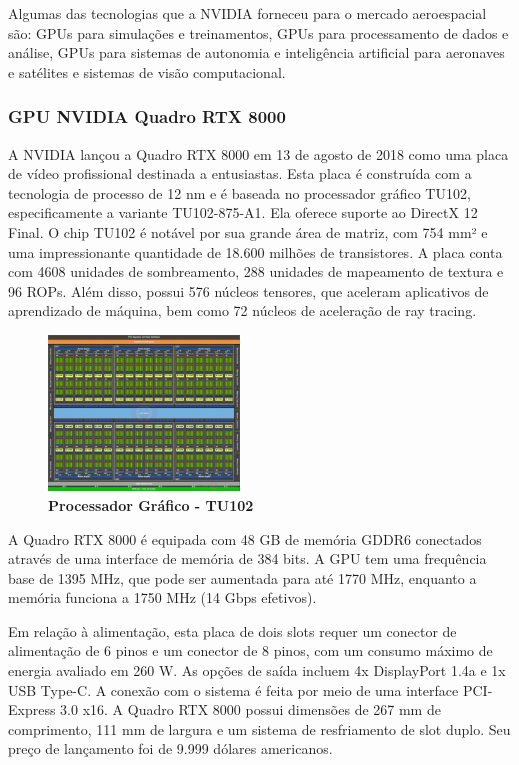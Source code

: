 \documentclass[conference]{IEEEtran}
\begin{document}
\par Algumas das tecnologias que a NVIDIA forneceu para o mercado aeroespacial são: GPUs para simulações e treinamentos, GPUs para processamento de dados e análise, GPUs para sistemas de autonomia e inteligência artificial para aeronaves e satélites e sistemas de visão computacional.

\subsubsection{GPU NVIDIA Quadro RTX 8000}

\par A NVIDIA lançou a Quadro RTX 8000 em 13 de agosto de 2018 como uma placa de vídeo profissional destinada a entusiastas. Esta placa é construída com a tecnologia de processo de 12 nm e é baseada no processador gráfico TU102, especificamente a variante TU102-875-A1. Ela oferece suporte ao DirectX 12 Final. O chip TU102 é notável por sua grande área de matriz, com 754 mm² e uma impressionante quantidade de 18.600 milhões de transistores. A placa conta com 4608 unidades de sombreamento, 288 unidades de mapeamento de textura e 96 ROPs. Além disso, possui 576 núcleos tensores, que aceleram aplicativos de aprendizado de máquina, bem como 72 núcleos de aceleração de ray tracing.

\begin{figure}[h]
\centerline{\includegraphics[width = 2.0in]{tu102.jpg}}
\caption{\textbf{Processador Gráfico - TU102}}
\label{figAM9300}
\end{figure}

\par A Quadro RTX 8000 é equipada com 48 GB de memória GDDR6 conectados através de uma interface de memória de 384 bits. A GPU tem uma frequência base de 1395 MHz, que pode ser aumentada para até 1770 MHz, enquanto a memória funciona a 1750 MHz (14 Gbps efetivos).

\par Em relação à alimentação, esta placa de dois slots requer um conector de alimentação de 6 pinos e um conector de 8 pinos, com um consumo máximo de energia avaliado em 260 W. As opções de saída incluem 4x DisplayPort 1.4a e 1x USB Type-C. A conexão com o sistema é feita por meio de uma interface PCI-Express 3.0 x16. A Quadro RTX 8000 possui dimensões de 267 mm de comprimento, 111 mm de largura e um sistema de resfriamento de slot duplo. Seu preço de lançamento foi de 9.999 dólares americanos.
\end{document}

